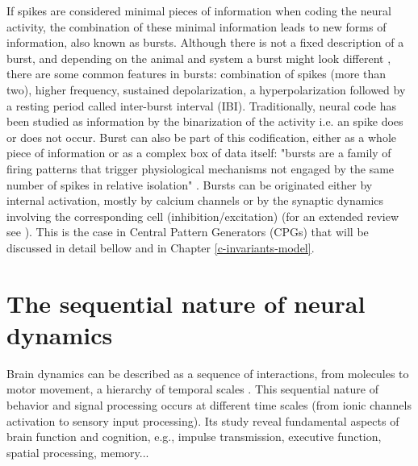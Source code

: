 If spikes are considered minimal pieces of information when coding the neural activity, the combination of these minimal information leads to new forms of information, also known as bursts. Although there is not a fixed description of a burst, and depending on the animal and system a burst might look different \parencite{russell_bursting_1978,palmu_detection_2010,lundqvist_gamma_2016}, there are some common features in bursts: combination of spikes (more than two), higher frequency, sustained depolarization, a hyperpolarization followed by a resting period called inter-burst interval (IBI). Traditionally, neural code has been studied as information by the binarization of the activity i.e. an spike does or does not occur. Burst can also be part of this codification, either as a whole piece of information or as a complex box of data itself: "bursts are a family of firing patterns that trigger physiological mechanisms not engaged by the same number of spikes in relative isolation" \parencite{friedenberger_silences_2023}. Bursts can be originated either by internal activation, mostly by calcium channels or by the synaptic dynamics involving the corresponding cell (inhibition/excitation) (for an extended review see \parencite{friedenberger_silences_2023}). This is the case in Central Pattern Generators (CPGs) \parencite{Katz,steuer_central_2018} that will be discussed in detail bellow and in Chapter \ref{c-invariants-model}.

\section{The sequential nature of neural dynamics}
Brain dynamics can be described as a sequence of interactions, from molecules to motor movement, a hierarchy of temporal scales \parencite{kiebel_hierarchy_2008}. This sequential nature of behavior and signal processing occurs at different time scales (from ionic channels activation to sensory input processing). Its study reveal fundamental aspects of brain function and cognition, e.g., impulse transmission, executive function, spatial processing, memory... 



